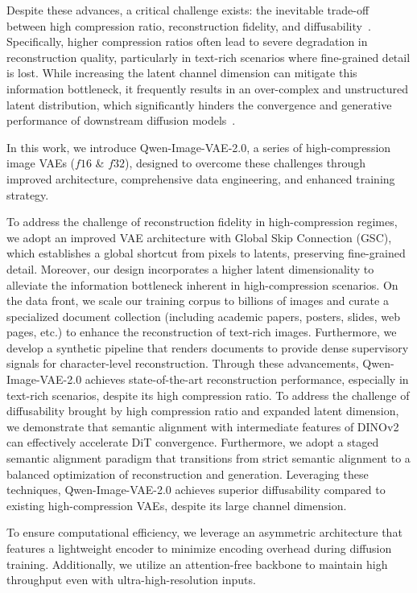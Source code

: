 \documentclass{llmxive}
\begin{document}
Despite these advances, a critical challenge exists: the inevitable trade-off between high compression ratio, reconstruction fidelity, and diffusability~\citep{diffusability}. Specifically, higher compression ratios often lead to severe degradation in reconstruction quality, particularly in text-rich scenarios where fine-grained detail is lost. While increasing the latent channel dimension can mitigate this information bottleneck, it frequently results in an over-complex and unstructured latent distribution, which significantly hinders the convergence and generative performance of downstream diffusion models~\citep{vavae, qiu2025image}.

In this work, we introduce Qwen-Image-VAE-2.0, a series of high-compression image VAEs ($f16$ \& $f32$), designed to overcome these challenges through improved architecture, comprehensive data engineering, and enhanced training strategy.

To address the challenge of reconstruction fidelity in high-compression regimes, we adopt an improved VAE architecture with Global Skip Connection (GSC), which establishes a global shortcut from pixels to latents, preserving fine-grained detail. Moreover, our design incorporates a higher latent dimensionality to alleviate the information bottleneck inherent in high-compression scenarios. On the data front, we scale our training corpus to billions of images and curate a specialized document collection (including academic papers, posters, slides, web pages, etc.) to enhance the reconstruction of text-rich images. Furthermore, we develop a synthetic pipeline that renders documents to provide dense supervisory signals for character-level reconstruction. Through these advancements, Qwen-Image-VAE-2.0 achieves state-of-the-art reconstruction performance, especially in text-rich scenarios, despite its high compression ratio.
To address the challenge of diffusability brought by high compression ratio and expanded latent dimension, we demonstrate that semantic alignment with intermediate features of DINOv2~\citep{dinov2} can effectively accelerate DiT convergence. Furthermore, we adopt a staged semantic alignment paradigm that transitions from strict semantic alignment to a balanced optimization of reconstruction and generation. Leveraging these techniques, Qwen-Image-VAE-2.0 achieves superior diffusability compared to existing high-compression VAEs, despite its large channel dimension.

To ensure computational efficiency, we leverage an asymmetric architecture that features a lightweight encoder to minimize encoding overhead during diffusion training. Additionally, we utilize an attention-free backbone to maintain high throughput even with ultra-high-resolution inputs. 
\end{document}
